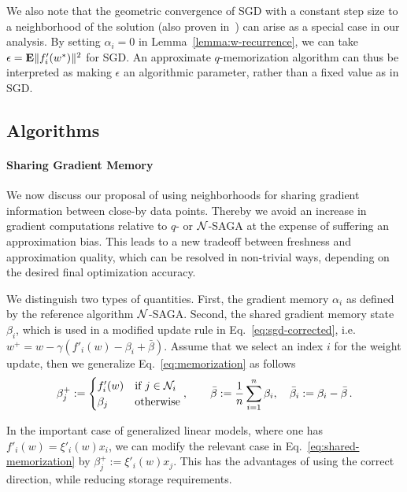 We also note that the geometric convergence of SGD with a constant step size to a neighborhood of the solution (also proven in~\cite{schmidt2014convergence}) can arise as a special case in our analysis. By setting $\alpha_i = 0$ in Lemma~\ref{lemma:w-recurrence}, we can take $\epsilon = {\mathbf E} \|f'_i(w^*)\|^2$ for SGD. An approximate $q$-memorization algorithm can thus be interpreted as making $\epsilon$ an algorithmic parameter, rather than a fixed value as in SGD.

\subsection{Algorithms} 

\paragraph*{Sharing Gradient Memory} 

We now discuss our proposal of using neighborhoods for sharing gradient information between close-by data points. Thereby we avoid an increase in gradient computations relative to $q$- or ${\cal N}$-SAGA at the expense of suffering an approximation bias. This leads to a new tradeoff between freshness  and approximation quality, which can be resolved in non-trivial ways, depending on the desired final optimization accuracy. 

We distinguish two types of quantities. First, the gradient memory $\alpha_i$ as defined by the reference algorithm ${\cal N}$-SAGA. Second, the shared gradient memory state $\beta_i$, which is used in a modified update rule in Eq.~\eqref{eq:sgd-corrected}, i.e.~$w^+ = w - \gamma ( f'_i(w) - \beta_i + \bar \beta )$. Assume that we select an index $i$ for the weight update, then we generalize Eq.~\eqref{eq:memorization} as follows
\begin{align}
\beta^+_j := \begin{cases} 
f'_i(w) & \text{if $j \in {\cal N}_i$} \\
\beta_j & \text{otherwise}
\end{cases}, \qquad \bar \beta := \frac 1n \sum_{i=1}^n \beta_i, \quad \bar \beta_i := \beta_i - \bar \beta \,.
\label{eq:shared-memorization}
\end{align}

%

In the important case of generalized linear models, where  one has 
%
$f'_i(w) = \xi'_i(w) x_i$, we can  modify the relevant case in Eq.~\eqref{eq:shared-memorization} by $\beta_j^+ := \xi'_i(w) x_j$. This has the advantages of using the correct direction, while reducing storage requirements. 

